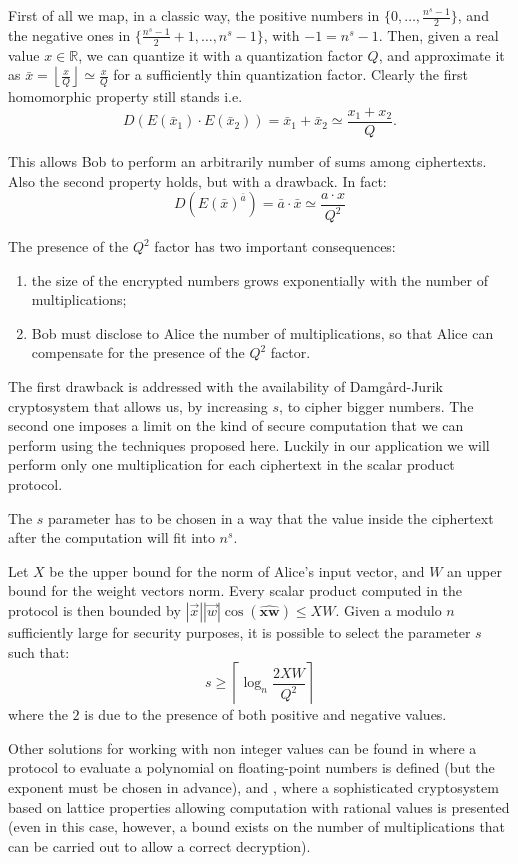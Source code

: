 \documentclass[11pt,oribibl,runningheads]{llncs}
\begin{document}
First of all we map, in a classic way, the positive numbers in $\{0,
\ldots, \frac{n^s-1}{2}\}$, and the negative ones in
$\{\frac{n^s-1}{2}+1, \ldots, n^s-1 \}$, with $-1=n^s-1$. Then,
given a real value $x \in \mathbb{R}$, we can quantize it with a
quantization factor $Q$, and approximate it as $\bar{x}=\left\lfloor
\frac{x}{Q} \right\rfloor \simeq \frac{x}{Q}$ for a sufficiently
thin quantization factor. Clearly the first homomorphic property
still stands i.e.
$$
D(E(\bar{x}_1)\cdot E(\bar{x}_2))=\bar{x}_1+\bar{x}_2 \simeq
\frac{x_1+x_2}{Q}.
$$

This allows Bob to perform an arbitrarily number of sums among
ciphertexts. Also the second property holds, but with a drawback. In
fact:
$$
D(E(\bar{x})^{\bar{a}})= \bar{a}\cdot\bar{x} \simeq \frac{a\cdot
x}{Q^2}
$$

The presence of the $Q^2$ factor has two important consequences:
\begin{enumerate}
    \item the size of the encrypted numbers grows exponentially
    with the number of multiplications;
    \item Bob must disclose to Alice the number of multiplications,
    so that Alice can compensate for the presence of the $Q^2$ factor.
\end{enumerate}

The first drawback is addressed with the availability of
Damg{\aa}rd-Jurik cryptosystem that allows us, by increasing $s$, to
cipher bigger numbers. The second one imposes a limit on the kind of
secure computation that we can perform using the techniques proposed
here. Luckily in our application we will perform only one
multiplication for each ciphertext in the scalar product protocol.

The $s$ parameter has to be chosen in a way that the value
inside the ciphertext after the computation will fit into $n^s$.

Let $X$ be the upper bound for the norm of Alice's input vector,
and $W$ an upper bound for the weight vectors norm. Every scalar
product computed in the protocol is then bounded by
$|\vec{x}||\vec{w}|\cos(\hat{\mathbf{xw}})\leq XW$. Given a
modulo $n$ sufficiently large for security purposes, it is possible
to select the parameter $s$ such that:
$$
s\geq \left\lceil \log_n \frac{2XW}{Q^2} \right\rceil
$$
where the $2$ is due to the presence of both positive and negative
values.

Other solutions for working with non integer values can be found in
\cite{chang2005ope} where a protocol to evaluate a polynomial on
floating-point numbers is defined (but the exponent must be chosen
in advance), and \cite{fouque2003cr}, where a sophisticated
cryptosystem based on lattice properties allowing computation with
rational values is presented (even in this case, however, a bound
exists on the number of multiplications that can be carried out to
allow a correct decryption).
\end{document}

